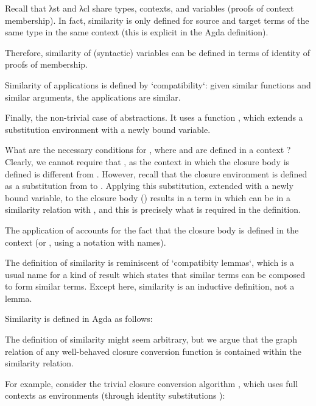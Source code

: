 \documentclass[bsc,frontabs,oneside,singlespacing,parskip,deptreport]{infthesis}
\theoremstyle{definition}
\begin{document}
Recall that λst and λcl share types, contexts, and variables (proofs
of context membership). In fact, similarity is only defined for source
and target terms of the same type in the same context (this is
explicit in the Agda definition).

Therefore, similarity of (syntactic) variables can be defined in terms
of identity of proofs of membership.

Similarity of applications is defined by `compatibility`: given
similar functions and similar arguments, the applications are similar.

Finally, the non-trivial case of abstractions. It uses a function
, which extends a substitution environment with a newly
bound variable.


What are the necessary conditions for , where
 and  are defined in a context ? Clearly,
we cannot require that , as the context  in which
the closure body is defined is different from . However, recall
that the closure environment  is defined as a substitution from
 to . Applying this substitution, extended with a newly
bound variable, to the closure body ()
results in a term in  which can be in a similarity relation with
, and this is precisely what is required in the definition.

The application of  accounts for the fact that the closure
body is defined in the context  (or , using a
notation with names).

The definition of similarity is reminiscent of `compatibity lemmas`,
which is a usual name for a kind of result which states that similar
terms can be composed to form similar terms. Except here, similarity
is an inductive definition, not a lemma.

Similarity is defined in Agda as follows:


The definition of similarity might seem arbitrary, but we argue that
the graph relation of any well-behaved closure conversion function is
contained within the similarity relation.

For example, consider the trivial closure conversion algorithm
, which uses full contexts as environments (through
identity substitutions ):
\end{document}
